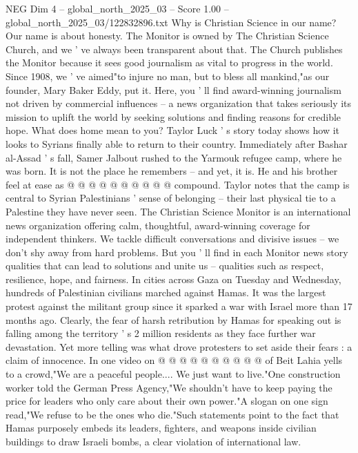 \begin{textsample}{NEG Dim 4 – global\_north\_2025\_03 – Score 1.00 – global\_north\_2025\_03/122832896.txt}  \label{ex:f4_neg_396}
Why is Christian Science in our name?
Our name is about honesty.
The Monitor is owned by The Christian Science Church, and we ' ve always been transparent about that.
The Church publishes the Monitor because it sees good journalism as vital to progress in the world.
Since 1908, we ' ve aimed"to injure no man, but to bless all mankind,"as our founder, Mary Baker Eddy, put it.
Here, you ' ll find award-winning journalism not driven by commercial influences -- a news organization that takes seriously its mission to uplift the world by seeking solutions and finding reasons for credible hope.
What does home mean to you?
Taylor Luck ' s story today shows how it looks to Syrians finally able to return to their country.
Immediately after Bashar al-Assad ' s fall, Samer Jalbout rushed to the Yarmouk refugee camp, where he was born.
It is not the place he remembers -- and yet, it is.
He and his brother feel at ease as @ @ @ @ @ @ @ @ @ @ compound.
Taylor notes that the camp is central to Syrian Palestinians ' sense of belonging -- their last physical tie to a Palestine they have never seen.
The Christian Science Monitor is an international news organization offering calm, thoughtful, award-winning coverage for independent thinkers.
We tackle difficult conversations and divisive issues -- we don't shy away from hard problems.
But you ' ll find in each Monitor news story qualities that can lead to solutions and unite us -- qualities such as respect, resilience, hope, and fairness.
In cities across Gaza on Tuesday and Wednesday, hundreds of Palestinian civilians marched against Hamas.
It was the largest protest against the militant group since it sparked a war with Israel more than 17 months ago.
Clearly, the fear of harsh retribution by Hamas for speaking out is falling among the territory ' s 2 million residents as they face further war devastation.
Yet more telling was what drove protesters to set aside their fears : a claim of innocence.
In one video on @ @ @ @ @ @ @ @ @ @ of Beit Lahia yells to a crowd,"We are a peaceful people....
We just want to live."One construction worker told the German Press Agency,"We shouldn't have to keep paying the price for leaders who only care about their own power."A slogan on one sign read,"We refuse to be the ones who die."Such statements point to the fact that Hamas purposely embeds its leaders, fighters, and weapons inside civilian buildings to draw Israeli bombs, a clear violation of international law.

\end{textsample}
